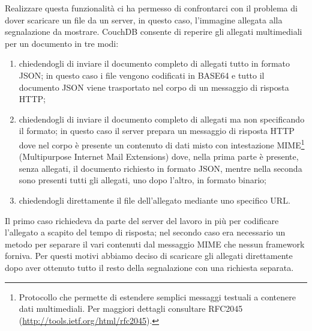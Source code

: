             Realizzare questa funzionalità ci ha permesso di confrontarci con il
            problema di dover scaricare un file da un server, in questo caso,
            l'immagine allegata alla segnalazione da mostrare. CouchDB
            consente di reperire gli allegati multimediali per un documento in
            tre modi:
            \begin{enumerate}
                \item chiedendogli di inviare il documento completo di allegati
                tutto in formato JSON; in questo caso i file vengono codificati
                in BASE64 e tutto il documento JSON viene trasportato nel corpo
                di un messaggio di risposta HTTP;
                \item chiedendogli di inviare il documento completo di allegati
                ma non specificando il formato; in questo caso il server prepara
                un messaggio di risposta HTTP dove nel corpo è presente un
                contenuto di dati misto con intestazione
                MIME\footnote{Protocollo che permette di estendere semplici
                messaggi testuali a contenere dati multimediali. Per maggiori
                dettagli consultare RFC2045
                (\url{http://tools.ietf.org/html/rfc2045}).} (Multipurpose
                Internet Mail Extensions) dove, nella prima parte è presente,
                senza allegati, il documento richiesto in formato JSON, mentre
                nella seconda sono presenti tutti gli allegati, uno dopo
                l'altro, in formato binario;
                \item chiedendogli direttamente il file dell'allegato mediante
                uno specifico URL.
            \end{enumerate}
            Il primo caso richiedeva da parte del server del lavoro in più per
            codificare l'allegato a scapito del tempo di risposta; nel secondo
            caso era necessario un metodo per separare il vari contenuti dal
            messaggio MIME che nessun framework forniva. Per questi motivi
            abbiamo deciso di scaricare gli allegati direttamente dopo aver
            ottenuto tutto il resto della segnalazione con una richiesta
            separata.

